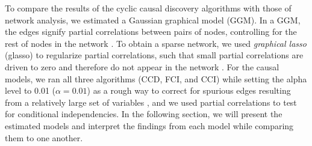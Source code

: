 \documentclass[twoside, 11pt]{article}
\begin{document}
To compare the results of the cyclic causal discovery algorithms with those of network analysis, we estimated a Gaussian graphical model (GGM). In a GGM, the edges signify partial correlations between pairs of nodes, controlling for the rest of nodes in the network \citep{epskamp_gaussian_2018}. To obtain a sparse network, we used \textit{graphical lasso} (glasso) to regularize partial correlations, such that small partial correlations are driven to zero and therefore do not appear in the network \citep{friedman_sparse_2008}. For the causal models, we ran all three algorithms (CCD, FCI, and CCI) while setting the alpha level to 0.01 ($\alpha = 0.01$) as a rough way to correct for spurious edges resulting from a relatively large set of variables \citep{zhang_kernel-based_2012}, and we used partial correlations to test for conditional independencies. 
In the following section, we will present the estimated models and interpret the findings from each model while comparing them to one another.

\restoregeometry

\end{document}
